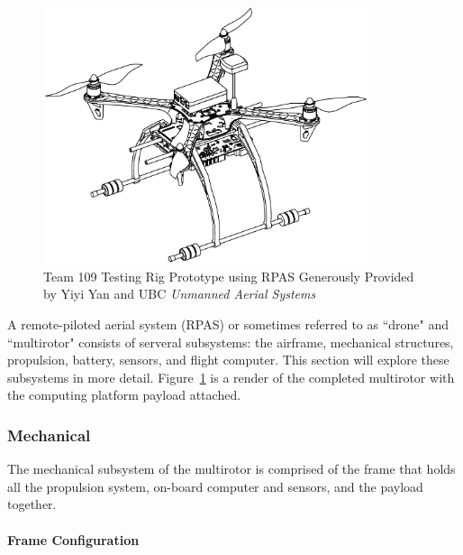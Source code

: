 \begin{figure}[H]
	\centering
	\includegraphics[width=0.85\textwidth]{img/testrigcad1.png}
	\caption[Team 109 Testing Rig Prototype]{Team 109 Testing Rig Prototype using RPAS Generously Provided by Yiyi Yan and UBC \textit{Unmanned Aerial Systems}}
	\label{fig:testrigcad1}
\end{figure}

A remote-piloted aerial system (RPAS) or sometimes referred to as ``drone" and ``multirotor" consists of serveral subsystems: the airframe, mechanical structures, propulsion, battery, sensors, and flight computer. This section will explore these subsystems in more detail. Figure~\ref{fig:testrigcad1} is a render of the completed multirotor with the computing platform payload attached.

\subsubsection{Mechanical}\label{section:drone-mech}
The mechanical subsystem of the multirotor is comprised of the frame that holds all the propulsion system, on-board computer and sensors, and the payload together.

\paragraph{Frame Configuration}

